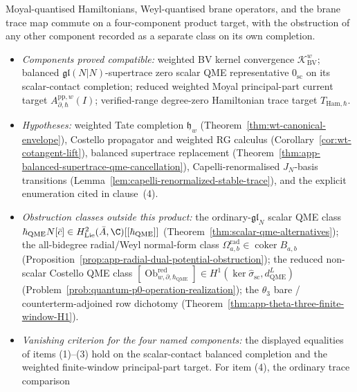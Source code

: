 \documentclass[11pt]{memoir}
\begin{document}
\begin{thm}\label{thm:componentwise-quantum-coefficient-comparison}
  Moyal-quantised Hamiltonians, Weyl-quantised brane operators, and the
	  brane trace map commute on a four-component product target,
	  with the obstruction of any other component recorded as a separate
	  class on its own completion.
  \begin{itemize}
    \item \emph{Components proved compatible:} weighted BV kernel
      convergence \(\mathcal K_{\mathrm{BV}}^w\); balanced
      \(\mathfrak{gl}(N|N)\)-supertrace zero scalar QME representative
      \(0_{\mathrm{sc}}\) on its scalar-contact completion; reduced
      weighted Moyal principal-part current target
      \(A^{\mathrm{pp},w}_{\partial,\hbar}(I)\); verified-range
      degree-zero Hamiltonian trace target \(T_{\mathrm{Ham},\hbar}\).
    \item \emph{Hypotheses:} weighted Tate completion
      \(\mathfrak h_w\) (Theorem~\ref{thm:wt-canonical-envelope}),
      Costello propagator and weighted RG calculus
      (Corollary~\ref{cor:wt-cotangent-lift}), balanced supertrace
      replacement
      (Theorem~\ref{thm:app-balanced-supertrace-qme-cancellation}),
      Capelli-renormalised \(J_N\)-basis transitions
      (Lemma~\ref{lem:capelli-renormalized-stable-trace}), and the
      explicit enumeration cited in clause~(4).
    \item \emph{Obstruction classes outside this product:} the
      ordinary-\(\mathfrak{gl}_N\) scalar QME class
      \(\hbar_{\mathrm{QME}}N[\bar c]\in
      H^2_{\mathrm{Lie}}(\bar A,\C)[[\hbar_{\mathrm{QME}}]]\)
      (Theorem~\ref{thm:scalar-qme-alternatives}); the all-bidegree
      radial/Weyl normal-form class
      \(\Omega^{\mathrm{rad}}_{a,b}\in\operatorname{coker}B_{a,b}\)
      (Proposition~\ref{prop:app-radial-dual-potential-obstruction});
      the reduced non-scalar Costello QME class
      \([\operatorname{Ob}^{\mathrm{red}}_{w,\partial,\hbar_{\mathrm{QME}}}]\in
      H^1(\ker\widehat\sigma_{\mathrm{sc}},d_{\mathrm{QME}}^{L})\)
      (Problem~\ref{prob:quantum-p0-operation-realization}); the
	      \(\theta_3\) bare / counterterm-adjoined row dichotomy
      (Theorem~\ref{thm:app-theta-three-finite-window-H1}).
    \item \emph{Vanishing criterion for the four named components:}
      the displayed equalities of items (1)--(3) hold on the
      scalar-contact balanced completion and the weighted finite-window
      principal-part target.  For item (4), the ordinary trace comparison

\end{itemize}
\end{thm}
\end{document}
